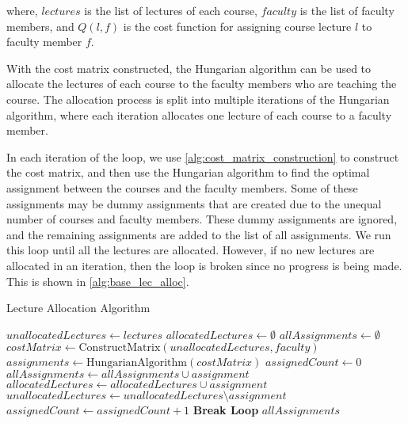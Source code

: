 where, \(lectures\) is the list of lectures of each course, \(faculty\) is the list of faculty members, and \(Q(l, f)\) is the cost function for assigning course lecture \(l\) to faculty member \(f\).

With the cost matrix constructed, the Hungarian algorithm can be used to allocate the lectures of each course to the faculty members who are teaching the course. The allocation process is split into multiple iterations of the Hungarian algorithm, where each iteration allocates one lecture of each course to a faculty member.

In each iteration of the loop, we use \autoref{alg:cost_matrix_construction} to construct the cost matrix, and then use the Hungarian algorithm to find the optimal assignment between the courses and the faculty members. Some of these assignments may be dummy assignments that are created due to the unequal number of courses and faculty members. These dummy assignments are ignored, and the remaining assignments are added to the list of all assignments. We run this loop until all the lectures are allocated. However, if no new lectures are allocated in an iteration, then the loop is broken since no progress is being made. This is shown in \autoref{alg:base_lec_alloc}.

\begin{algorithm}[H]
  \caption{Lecture Allocation Algorithm}
  \begin{algorithmic}[1]
    \State $unallocatedLectures \gets lectures$
    \State $allocatedLectures \gets \emptyset$
    \State $allAssignments \gets \emptyset$
     
    \State $costMatrix \gets \text{ConstructMatrix}(unallocatedLectures, faculty)$
    \State $assignments \gets \text{HungarianAlgorithm}(costMatrix)$
    \State $assignedCount \gets 0$
    \State $allAssignments \gets allAssignments \cup assignment$
    \State $allocatedLectures \gets allocatedLectures \cup assignment$
    \State $unallocatedLectures \gets unallocatedLectures \setminus assignment$
    \State $assignedCount \gets assignedCount + 1$
    \EndIf
    \EndFor
    \State \textbf{Break Loop}
    \EndIf
    \EndWhile
    \State \Return $allAssignments$
    \EndProcedure
  \end{algorithmic}
  \label{alg:base_lec_alloc}
\end{algorithm}

